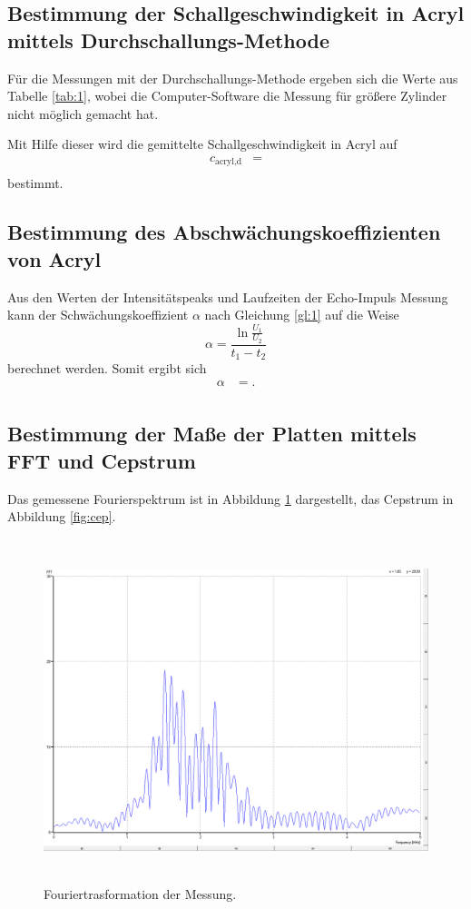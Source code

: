\subsection{Bestimmung der Schallgeschwindigkeit in Acryl mittels Durchschallungs-Methode}
Für die Messungen mit der Durchschallungs-Methode ergeben sich die Werte aus Tabelle \ref{tab:1}, wobei die Computer-Software die Messung für größere Zylinder nicht möglich gemacht hat.
  
Mit Hilfe dieser wird die gemittelte Schallgeschwindigkeit in Acryl auf
\begin{align*}
  c_{\text{acryl,d}} &= \\
\end{align*}
bestimmt.

\subsection{Bestimmung des Abschwächungskoeffizienten von Acryl}
Aus den Werten der Intensitätspeaks und Laufzeiten der Echo-Impuls Messung kann der Schwächungskoeffizient $\alpha$ nach Gleichung \ref{gl:1} auf die Weise
\begin{equation}
  \alpha = \frac{\ln{\frac{U_1}{U_2}}}{t_1-t_2}
\end{equation}
berechnet werden.
Somit ergibt sich
\begin{align*}
  \alpha &= .\\
\end{align*}

\subsection{Bestimmung der Maße der Platten mittels FFT und Cepstrum}
Das gemessene Fourierspektrum ist in Abbildung \ref{fig:fft} dargestellt, das Cepstrum in Abbildung \ref{fig:cep}.
\begin{figure}
  \centering
  \includegraphics[height=10cm]{messdaten/fourier.png}
  \caption{Fouriertrasformation der Messung.}
  \label{fig:fft}
\end{figure}

